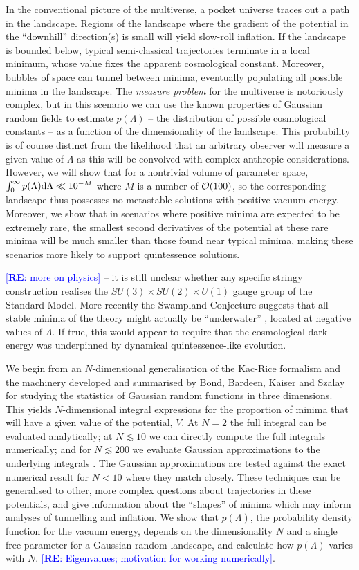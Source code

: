 \documentclass[12pt]{article}
\newcommand{\re}[1]{\textcolor{blue}{[{\bf RE}: #1]}}
\begin{document}
In the conventional picture of the multiverse, a pocket universe traces out a path in the landscape. Regions of the landscape where the gradient of the potential in the ``downhill'' direction(s) is small will yield slow-roll inflation. If the landscape is bounded below, typical semi-classical trajectories terminate in a local minimum, whose value fixes the apparent cosmological constant. Moreover, bubbles of space can tunnel between minima, eventually populating all possible minima in the landscape.  The {\em measure problem\/} for the multiverse is notoriously complex, but in this scenario we can use the known properties of Gaussian random fields to estimate $p(\Lambda)$ -- the distribution of possible cosmological constants -- as a function of the dimensionality of the landscape.  This probability is of course distinct from the likelihood that an arbitrary observer will measure a given value of $\Lambda$ as this will be convolved with complex anthropic considerations. However, we will show that for a nontrivial volume of parameter space,  $\int_0^\infty  p(\Lambda) {\rm d}\Lambda \ll 10^{-M}$  where $M$ is a number of ${\cal{O}}(100)$, so the corresponding landscape thus possesses no metastable solutions with  positive vacuum energy. Moreover, we show that in scenarios where positive minima are expected to be extremely rare, the smallest second derivatives of the potential at these rare minima will be much smaller than those found near typical minima, making these scenarios more likely to support quintessence solutions. 


\re{more on physics} 
 -- it is still unclear whether any specific stringy construction  realises  the $SU(3) \times SU(2) \times U(1)$ gauge group of the Standard Model.  More recently the Swampland Conjecture suggests that all stable minima of the theory might actually be ``underwater'' \cite{Agrawal2018},  located at negative values of $\Lambda$. If true, this would appear to require that the cosmological dark energy was underpinned by dynamical quintessence-like evolution.  


 We begin from an $N$-dimensional generalisation of the Kac-Rice formalism \cite{Kac1943,Rice1945} and the  machinery developed and summarised by Bond, Bardeen, Kaiser and Szalay  \cite{BBKS} for studying the statistics of Gaussian random functions in three dimensions. This yields $N$-dimensional integral expressions for the proportion of minima that will have a given value of the potential, $V$. At $N=2$ the full integral can be evaluated analytically; at $N \lesssim 10$ we can directly compute the full integrals numerically; and for $N \lesssim 200$ we evaluate Gaussian approximations to the underlying integrals . The Gaussian approximations are tested against the exact numerical result for $N <10$ where they match closely. These techniques can be generalised to other, more complex questions about trajectories in these potentials, and give information about the ``shapes'' of minima which may inform analyses of tunnelling and inflation. We show that $p(\Lambda)$, the probability density function for the vacuum energy, depends on the dimensionality $N$ and a single free parameter for a Gaussian random landscape, and calculate how $p(\Lambda)$ varies with $N$. \re{Eigenvalues; motivation for working numerically}.
\end{document}
